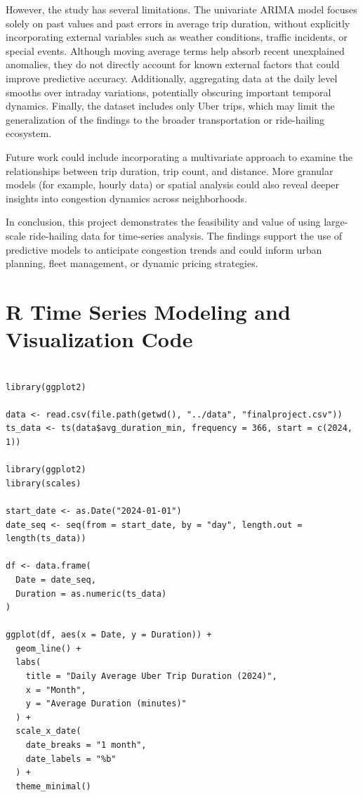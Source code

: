 \documentclass{article}
\begin{document}
However, the study has several limitations. The univariate ARIMA model focuses solely on past values and past errors in average trip duration, without explicitly incorporating external variables such as weather conditions, traffic incidents, or special events. Although moving average terms help absorb recent unexplained anomalies, they do not directly account for known external factors that could improve predictive accuracy. Additionally, aggregating data at the daily level smooths over intraday variations, potentially obscuring important temporal dynamics. Finally, the dataset includes only Uber trips, which may limit the generalization of the findings to the broader transportation or ride-hailing ecosystem.

Future work could include incorporating a multivariate approach to examine the relationships between trip duration, trip count, and distance. More granular models (for example, hourly data) or spatial analysis could also reveal deeper insights into congestion dynamics across neighborhoods.

In conclusion, this project demonstrates the feasibility and value of using large-scale ride-hailing data for time-series analysis. The findings support the use of predictive models to anticipate congestion trends and could inform urban planning, fleet management, or dynamic pricing strategies.


\appendix

\section{R Time Series Modeling and Visualization Code}
\label{appendix:rcode}
\begin{lstlisting}[style=rstyle, caption={Loading and Plotting Time Series}, label={lst:r_ts_plot}]

library(ggplot2)

data <- read.csv(file.path(getwd(), "../data", "finalproject.csv"))
ts_data <- ts(data$avg_duration_min, frequency = 366, start = c(2024, 1))

library(ggplot2)
library(scales)

start_date <- as.Date("2024-01-01")
date_seq <- seq(from = start_date, by = "day", length.out = length(ts_data))

df <- data.frame(
  Date = date_seq,
  Duration = as.numeric(ts_data)
)

ggplot(df, aes(x = Date, y = Duration)) +
  geom_line() +
  labs(
    title = "Daily Average Uber Trip Duration (2024)",
    x = "Month",
    y = "Average Duration (minutes)"
  ) +
  scale_x_date(
    date_breaks = "1 month",
    date_labels = "%b"
  ) +
  theme_minimal()
\end{lstlisting}
\end{document}
